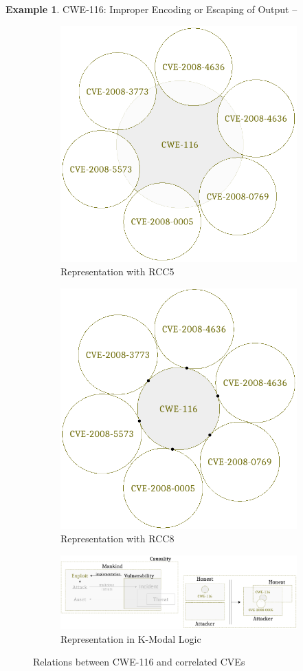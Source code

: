\documentclass{article}
\theoremstyle{definition}
\theoremstyle{corollary}
\theoremstyle{lemma}
\theoremstyle{theorem}
\theoremstyle{theorem}
\newtheorem{example}{Example}
\begin{document}
\begin{example}{CWE-116: Improper Encoding or Escaping of Output\autocite{CWE-116} --}
\begin{figure}[t]
	\centering
	\begin{subfigure}[b]{.5\textwidth}
		\centering
		\includegraphics[width=.7\textwidth]{rcc5_CWE-116.pdf}
		\caption{Representation with RCC5}
		\label{fig:rcc5_CWE-116}
	\end{subfigure}\begin{subfigure}[b]{.5\textwidth}
		\centering
		\includegraphics[width=.7\textwidth]{rcc8_CWE-116.pdf}
		\caption{Representation with RCC8}
		\label{fig:rcc8_CWE-116}
	\end{subfigure}
	\begin{subfigure}[b]{\textwidth}
		\centering
		\includegraphics[width=\textwidth]{KML_CWE-116.pdf}
		\caption{Representation in K-Modal Logic}
		\label{fig:KML_CWE-116}
	\end{subfigure}
	\caption{Relations between CWE-116 and correlated CVEs}
\end{figure}

\end{example}
\end{document}

